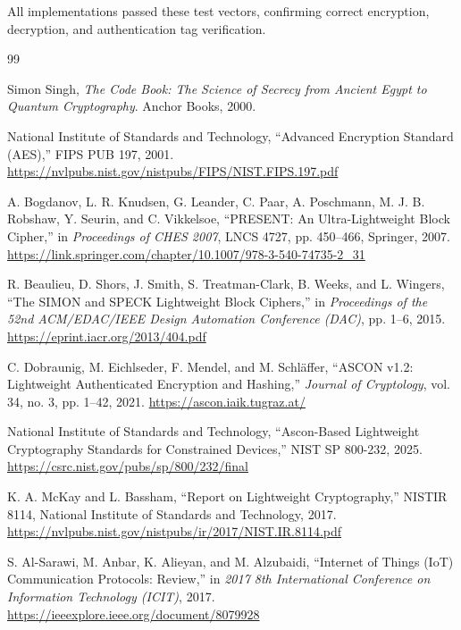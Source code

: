 \documentclass[12pt]{report}
\begin{document}
All implementations passed these test vectors, confirming correct encryption, decryption, and authentication tag verification.

\newpage
\begin{thebibliography}{99}

    Simon Singh, \textit{The Code Book: The Science of Secrecy from Ancient Egypt to Quantum Cryptography}. Anchor Books, 2000.

    National Institute of Standards and Technology, ``Advanced Encryption Standard (AES),'' FIPS PUB 197, 2001.
    \url{https://nvlpubs.nist.gov/nistpubs/FIPS/NIST.FIPS.197.pdf}

    A. Bogdanov, L. R. Knudsen, G. Leander, C. Paar, A. Poschmann, M. J. B. Robshaw, Y. Seurin, and C. Vikkelsoe, ``PRESENT: An Ultra-Lightweight Block Cipher,'' in \textit{Proceedings of CHES 2007}, LNCS 4727, pp. 450--466, Springer, 2007.
    \url{https://link.springer.com/chapter/10.1007/978-3-540-74735-2_31}

    R. Beaulieu, D. Shors, J. Smith, S. Treatman-Clark, B. Weeks, and L. Wingers, ``The SIMON and SPECK Lightweight Block Ciphers,'' in \textit{Proceedings of the 52nd ACM/EDAC/IEEE Design Automation Conference (DAC)}, pp. 1--6, 2015.
    \url{https://eprint.iacr.org/2013/404.pdf}

    C. Dobraunig, M. Eichlseder, F. Mendel, and M. Schläffer, ``ASCON v1.2: Lightweight Authenticated Encryption and Hashing,'' \textit{Journal of Cryptology}, vol. 34, no. 3, pp. 1--42, 2021.
    \url{https://ascon.iaik.tugraz.at/}

    National Institute of Standards and Technology, ``Ascon-Based Lightweight Cryptography Standards for Constrained Devices,'' NIST SP 800-232, 2025.
    \url{https://csrc.nist.gov/pubs/sp/800/232/final}

    K. A. McKay and L. Bassham, ``Report on Lightweight Cryptography,'' NISTIR 8114, National Institute of Standards and Technology, 2017.
    \url{https://nvlpubs.nist.gov/nistpubs/ir/2017/NIST.IR.8114.pdf}

    S. Al-Sarawi, M. Anbar, K. Alieyan, and M. Alzubaidi, ``Internet of Things (IoT) Communication Protocols: Review,'' in \textit{2017 8th International Conference on Information Technology (ICIT)}, 2017.
    \url{https://ieeexplore.ieee.org/document/8079928}


\end{thebibliography}
\end{document}
